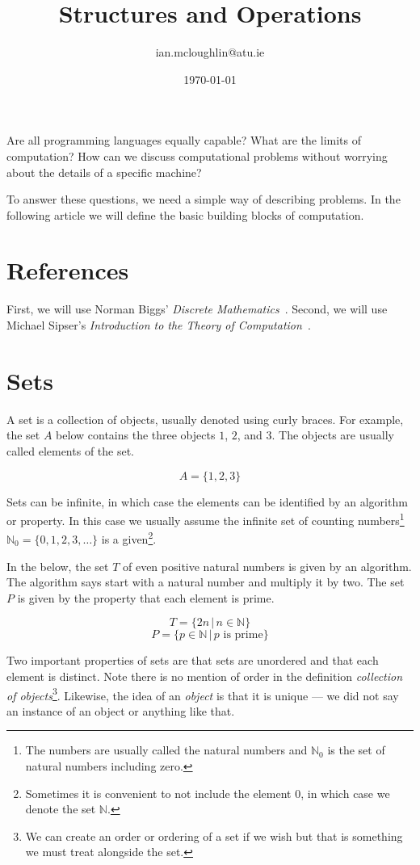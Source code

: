 \documentclass{iansnotes}
\title{Structures and Operations}
\author{ian.mcloughlin@atu.ie}
\date{\today}
\begin{document}
\maketitle

Are all programming languages equally capable?
What are the limits of computation?
How can we discuss computational problems without worrying about the details of a specific machine?

To answer these questions, we need a simple way of describing problems.
In the following article we will define the basic building blocks of computation.


\section{References}
First, we will use Norman Biggs' \emph{Discrete Mathematics}~\autocite{biggs}.
Second, we will use Michael Sipser's \emph{Introduction to the Theory of Computation}~\autocite{sipser}.

\section{Sets} 
  A set is a collection of objects, usually denoted using curly braces\autocite[3]{sipser}.
  For example, the set $A$ below contains the three objects $1$, $2$, and $3$.
  The objects are usually called elements of the set.

  $$ A = \{ 1, 2, 3 \} $$

  Sets can be infinite, in which case the elements can be identified by an algorithm or property.
  In this case we usually assume the infinite set of counting numbers\footnote{The numbers are usually called the natural numbers and $\mathbb{N}_0$ is the set of natural numbers including zero.} $\mathbb{N}_0 = \{ 0, 1, 2, 3, \ldots \}$ is a given\footnote{Sometimes it is convenient to not include the element $0$, in which case we denote the set $\mathbb{N}$.}.

  In the below, the set $T$ of even positive natural numbers is given by an algorithm.
  The algorithm says start with a natural number and multiply it by two.
  The set $P$ is given by the property that each element is prime.

  $$ T = \{ 2n \, | \, n \in \mathbb{N} \} $$
  $$ P = \{ p \in \mathbb{N} \, | \, p \textrm{ is prime} \} $$

  Two important properties of sets are that sets are unordered and that each element is distinct.
  Note there is no mention of order in the definition \emph{collection of objects}\footnote{We can create an order or ordering of a set if we wish but that is something we must treat alongside the set.}.
  Likewise, the idea of an \emph{object} is that it is unique --- we did not say an instance of an object or anything like that.
\end{document}
